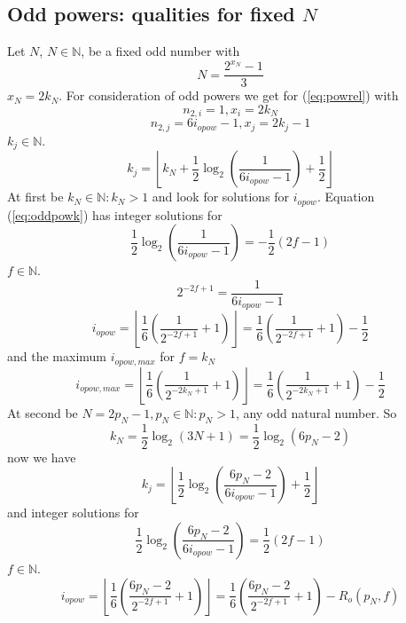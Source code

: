 \documentclass{aomart}
\theoremstyle{definition}
\begin{document}
\subsection{Odd powers: qualities for fixed $N$}
\label{ss:oddqual}
Let $N$, $N \in \mathbb{N}$, be a fixed odd number with
\begin{equation}\label{eq:N}
	N = \frac{2^{x_{N}}-1}{3}
\end{equation}
$x_{N} = 2k_{N}$. For consideration of odd powers we get for (\ref{eq:powrel}) with
\[ n_{2,i} = 1, x_{i} = 2k_{N} \]
\[ n_{2,j} = 6i_{opow} - 1, x_{j} = 2k_{j} - 1 \]
$k_{j} \in \mathbb{N}$.
\begin{equation}\label{eq:oddpowk}
	k_{j} = \left\lfloor k_{N} + \frac{1}{2} \log_{2} \left( \frac{1}{6i_{opow}-1} \right) + \frac{1}{2} \right\rfloor
\end{equation}
At first be $k_{N} \in \mathbb{N}: k_{N} > 1$ and look for solutions for $i_{opow}$. Equation (\ref{eq:oddpowk}) has integer solutions for
\[ \frac{1}{2} \log_{2}\left( \frac{1}{6i_{opow}-1} \right) = -\frac{1}{2}(2f-1) \]
$f \in \mathbb{N}$.
\[ 2^{-2f+1} = \frac{1}{6i_{opow}-1} \]
\begin{equation}\label{eq:oddpowi}
	i_{opow} = \left\lfloor \frac{1}{6} \left( \frac{1}{2^{-2f+1}} + 1 \right) \right\rfloor = \frac{1}{6} \left( \frac{1}{2^{-2f+1}} + 1 \right) - \frac{1}{2}
\end{equation}
and the maximum $i_{opow,max}$ for $f=k_{N}$
\begin{equation}\label{eq:oddpowimax}
	i_{opow,max} = \left\lfloor \frac{1}{6} \left( \frac{1}{2^{-2k_{N}+1}} + 1 \right) \right\rfloor = \frac{1}{6} \left( \frac{1}{2^{-2k_{N}+1}} + 1 \right) - \frac{1}{2}
\end{equation}
At second be $N=2p_{N}-1, p_{N} \in \mathbb{N}: p_{N} > 1$, any odd natural number. So
\begin{equation}\label{eq:anyN}
	k_{N} = \frac{1}{2} \log_{2} \left( 3N+1 \right) = \frac{1}{2} \log_{2} \left( 6p_{N}-2 \right)  
\end{equation}
now we have
\begin{equation}\label{eq:oddpowanyk}
	k_{j} = \left\lfloor \frac{1}{2} \log_{2} \left( \frac{6p_{N}-2}{6i_{opow}-1} \right) + \frac{1}{2} \right\rfloor
\end{equation}
and integer solutions for
\[ \frac{1}{2} \log_{2} \left( \frac{6p_{N}-2}{6i_{opow}-1} \right) = \frac{1}{2}(2f-1) \]
$f \in \mathbb{N}$.
\begin{equation}\label{eq:oddpowanyki}
	i_{opow} = \left\lfloor \frac{1}{6} \left( \frac{6p_{N}-2}{2^{-2f+1}} + 1 \right) \right\rfloor = \frac{1}{6} \left( \frac{6p_{N}-2}{2^{-2f+1}} + 1 \right) - R_{o}(p_{N},f)
\end{equation}
\end{document}
